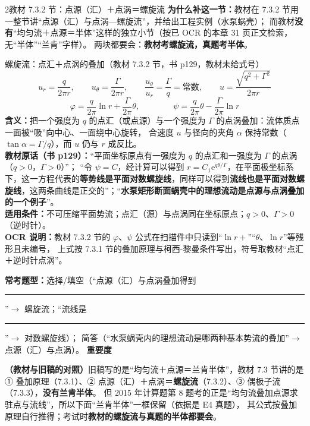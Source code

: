 \begin{kaodian}{2}{教材 7.3.2 节：点源（汇）＋点涡＝螺旋流}
\textbf{为什么补这一节：}教材在 7.3.2 节用一整节讲“点源（汇）与点涡—螺旋流”，并给出工程实例（水泵蜗壳）；
而教材\textbf{没有}“均匀流＋点源＝半体”这样的独立小节（按已 OCR 的本章 31 页正文检索，无“半体”“兰肯”字样）。
两块都要会：\textbf{教材考螺旋流，真题考半体}。

\begin{gongshi}{螺旋流：点汇＋点涡的叠加（教材 7.3.2 节，书 p129，教材未给式号）}
\[ u_r=\frac{q}{2\pi r},\qquad u_\theta=\frac{\Gamma}{2\pi r},\qquad
   \frac{u_\theta}{u_r}=\frac{\Gamma}{q}=\text{常数},\qquad u=\frac{\sqrt{q^2+\Gamma^2}}{2\pi r} \]
\[ \varphi=\frac{q}{2\pi}\ln r+\frac{\Gamma}{2\pi}\theta,\qquad\qquad
   \psi=\frac{q}{2\pi}\theta-\frac{\Gamma}{2\pi}\ln r \]
\textbf{含义：}把一个强度为 $q$ 的点汇（或点源）与一个强度为 $\Gamma$ 的点涡叠加：流体质点一面被“吸”向中心、一面绕中心旋转，
合速度 $u$ 与径向的夹角 $\alpha$ 保持常数（$\tan\alpha=\Gamma/q$），而 $u$ 仍与 $r$ 成反比。\\
\textbf{教材原话（书 p129）：}“平面坐标原点有一强度为 $q$ 的点汇和一强度为 $\Gamma$ 的点涡（$q>0$，$\Gamma>0$）”；
“令 $\psi=C$，经计算可以得到 $r=C_1\mathrm{e}^{q\theta/\Gamma}$，在平面极坐标系下，这一方程代表的\textbf{等势线是平面对数螺旋线}，同样可以得到\textbf{流线也是平面对数螺旋线}，这两条曲线是正交的”；“\textbf{水泵矩形断面蜗壳中的理想流动是点源与点涡叠加的一个例子}”。\\
\textbf{适用条件：}不可压缩平面势流；点汇（源）与点涡同在坐标原点；$q>0$、$\Gamma>0$（逆时针）。\\
\textbf{OCR 说明：}教材 7.3.2 节的 $\varphi$、$\psi$ 公式在扫描件中只读到“$\ln r+$”“$\theta$、$\ln r$”等残形且未编号，
上式按 7.3.1 节的叠加原理与柯西-黎曼条件写出，符号取教材“点汇＋逆时针点涡”。
\end{gongshi}

\textbf{常考题型：}选择/填空（“点源（汇）与点涡叠加得到\rule{1.8cm}{0.4pt}”$\to$ 螺旋流；“流线是\rule{1.6cm}{0.4pt}”$\to$ 对数螺旋线）；
简答（“水泵蜗壳内的理想流动是哪两种基本势流的叠加”$\to$ 点源（汇）与点涡）。
\textbf{重要度 }\quad{}\quad{}
\end{kaodian}

\begin{tishi}
\textbf{（教材与旧稿的对照）}旧稿写的是“均匀流＋点源＝兰肯半体”，教材 7.3 节讲的是
① 叠加原理（7.3.1）、② 点源（汇）＋点涡＝\textbf{螺旋流}（7.3.2）、③ 偶极子流（7.3.3），\textbf{没有兰肯半体}。
但 2015 年计算题第 8 题考的正是“均匀流叠加点源求驻点与流线”，所以下面“兰肯半体”一框保留（依据是 E4 真题），
其公式按叠加原理自行推得；考试时\textbf{教材的螺旋流与真题的半体都要会}。
\end{tishi}

